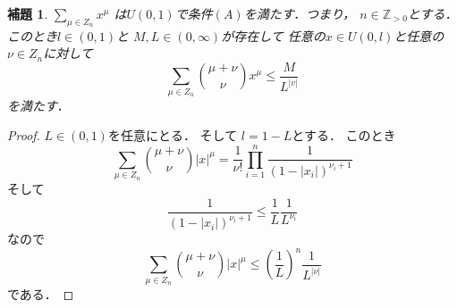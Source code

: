 \documentclass[leqno, a4paper, 12pt]{jsarticle}
\newtheorem{lem}[thm]{補題}
\newcommand{\zz}{\mathbb{Z}}
\begin{document}
\begin{lem}\label{lem:xxx}
$\sum_{\mu\in Z_n}x^{\mu}$
は$U(0, 1)$で条件$(A)$を満たす．つまり，
$n\in \zz_{>0}$とする．
このとき$l\in (0, 1)$と
$M, L\in (0, \infty)$が存在して
任意の$x\in U(0, l)$と任意の$\nu\in Z_n$に対して
\[
\sum_{\mu\in Z_n}\binom{\mu+\nu}{\nu}x^{\mu}\le \frac{M}{L^{|v|}}
\]
を満たす．
\end{lem}
\begin{proof}
$L\in (0, 1)$を任意にとる．
そして
$l=1-L $とする．
このとき
\[
\sum_{\mu\in Z_n}\binom{\mu+\nu}{\nu}|x|^{\mu}
=
\frac{1}{\nu!}\prod_{i=1}^n\frac{1}{(1-|x_i|)^{\nu_i+1}}
\]
そして
\[
\frac{1}{(1-|x_i|)^{\nu_i+1}}
\le \frac{1}{L}\frac{1}{L^{\nu_i}}
\]
なので
\[
\sum_{\mu\in Z_n}\binom{\mu+\nu}{\nu}|x|^{\mu}\le 
\left(\frac{1}{L}\right)^n\frac{1}{L^{|\nu|}}
\]
である．
\end{proof}
\end{document}
